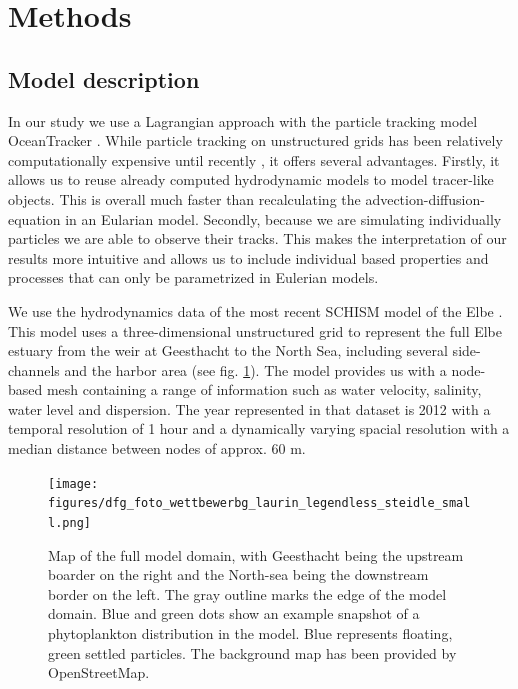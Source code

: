 \documentclass[npg, manuscript]{copernicus}
\begin{document}
\section{Methods}

\subsection{Model description}


In our study we use a Lagrangian approach with the particle tracking model OceanTracker \citep{Vennell2021}.
While particle tracking on unstructured grids has been relatively computationally expensive until recently \citep{Vennell2021}, it offers several advantages.
Firstly, it allows us to reuse already computed hydrodynamic models to model tracer-like objects.
This is overall much faster than recalculating the advection-diffusion-equation in an Eularian model.
Secondly, because we are simulating individually particles we are able to observe their tracks.
This makes the interpretation of our results more intuitive and allows us to include individual based properties and processes that can only be parametrized in Eulerian models.

We use the hydrodynamics data of the most recent SCHISM model of the Elbe \citep{Pein2021}.
This model uses a three-dimensional unstructured  grid to represent the full Elbe estuary from the weir at Geesthacht to the North Sea, including several side-channels and the harbor area (see fig. \ref{fig:model_domain}). 
The model provides us with a node-based mesh containing a range of information such as water velocity, salinity, water level and dispersion.
The year represented in that dataset is 2012 with a temporal resolution of 1 hour and a dynamically varying spacial resolution with a median distance between nodes of approx. 60 \unit{m}.

\begin{figure}
    \texttt{[image: figures/dfg\_foto\_wettbewerbg\_laurin\_legendless\_steidle\_small.png]}
    \caption{Map of the full model domain, with Geesthacht being the upstream boarder on the right and the North-sea being the downstream border on the left. The gray outline marks the edge of the model domain. Blue and green dots show an example snapshot of a phytoplankton distribution in the model. Blue represents floating, green settled particles. The background map has been provided by OpenStreetMap.}
    \label{fig:model_domain}
\end{figure}
\end{document}
